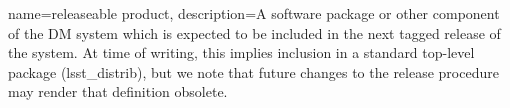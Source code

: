 
{
  name={releaseable product},
  description={A software package or other component of the DM system which
  is expected to be included in the next tagged release of the system. At time
  of writing, this implies inclusion in a standard top-level package
  (lsst\_distrib), but we note that future changes to the release procedure
  may render that definition obsolete.}
}
